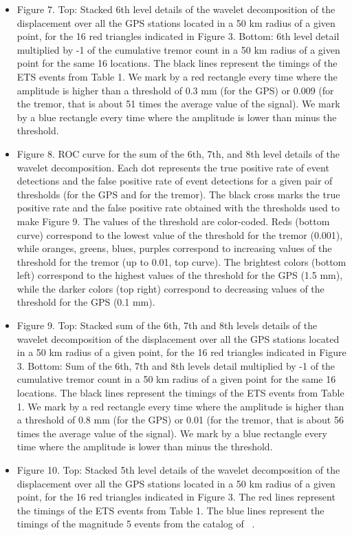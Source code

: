\documentclass{article}
\begin{document}
\begin{itemize}
\item Figure 7. Top: Stacked 6th level details of the wavelet decomposition of the displacement over all the GPS stations located in a 50 km radius of a given point, for the 16 red triangles indicated in Figure 3. Bottom: 6th level detail multiplied by -1 of the cumulative tremor count in a 50 km radius of a given point for the same 16 locations. The black lines represent the timings of the ETS events from Table 1. We mark by a red rectangle every time where the amplitude is higher than a threshold of 0.3 mm (for the GPS) or 0.009 (for the tremor, that is about 51 times the average value of the signal). We mark by a blue rectangle every time where the amplitude is lower than minus the threshold.

\item Figure 8. ROC curve for the sum of the 6th, 7th, and 8th level details of the wavelet decomposition. Each dot represents the true positive rate of event detections and the false positive rate of event detections for a given pair of thresholds (for the GPS and for the tremor). The black cross marks the true positive rate and the false positive rate obtained with the thresholds used to make Figure 9. The values of the threshold are color-coded. Reds (bottom curve) correspond to the lowest value of the threshold for the tremor (0.001), while oranges, greens, blues, purples correspond to increasing values of the threshold for the tremor (up to 0.01, top curve). The brightest colors (bottom left) correspond to the highest values of the threshold for the GPS (1.5 mm), while the darker colors (top right) correspond to decreasing values of the threshold for the GPS (0.1 mm).

\item Figure 9. Top: Stacked sum of the 6th, 7th and 8th levels details of the wavelet decomposition of the displacement over all the GPS stations located in a 50 km radius of a given point, for the 16 red triangles indicated in Figure 3. Bottom: Sum of the 6th, 7th and 8th levels detail multiplied by -1 of the cumulative tremor count in a 50 km radius of a given point for the same 16 locations. The black lines represent the timings of the ETS events from Table 1. We mark by a red rectangle every time where the amplitude is higher than a threshold of 0.8 mm (for the GPS) or 0.01 (for the tremor, that is about 56 times the average value of the signal). We mark by a blue rectangle every time where the amplitude is lower than minus the threshold.

\item Figure 10. Top: Stacked 5th level details of the wavelet decomposition of the displacement over all the GPS stations located in a 50 km radius of a given point, for the 16 red triangles indicated in Figure 3. The red lines represent the timings of the ETS events from Table 1. The blue lines represent the timings of the magnitude 5 events from the catalog of ~\citet{MIC_2019}.


\end{itemize}
\end{document}
